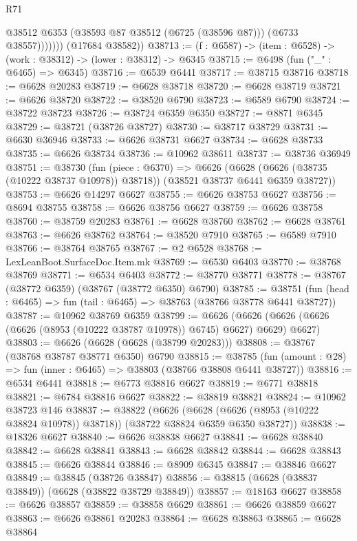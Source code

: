 \begin{lexlean}{R71}
\begin{coremodule}
                  @38512
                  @6353
                  (@38593 @87 @38512 (@6725 (@38596 @87)))
                  (@6733 @38557)))))))
      (@17684 @38582))
@38713 := (f : @6587) -> (item : @6528) -> (work : @38312) -> (lower : @38312) -> @6345
@38715 := @6498 (fun ("_" : @6465) => @6345)
@38716 := @6539 @6441
@38717 := @38715 @38716
@38718 := @6628 @20283
@38719 := @6628 @38718
@38720 := @6628 @38719
@38721 := @6626 @38720
@38722 := @38520 @6790
@38723 := @6589 @6790
@38724 := @38722 @38723
@38726 := @38724 @6359 @6350
@38727 := @8871 @6345
@38729 := @38721 (@38726 @38727)
@38730 := @38717 @38729
@38731 := @6630 @36946
@38733 := @6626 @38731 @6627
@38734 := @6628 @38733
@38735 := @6626 @38734
@38736 := @10962 @38611
@38737 := @38736 @36949
@38751 := @38730
    (fun (piece : @6370) =>
    @6626 (@6628 (@6626 (@38735 (@10222 @38737 @10978)) @38718)) (@38521 @38737 @6441 @6359 @38727))
@38753 := @6626 @14297 @6627
@38755 := @6626 @38753 @6627
@38756 := @8694 @38755
@38758 := @6626 @38756 @6627
@38759 := @6626 @38758
@38760 := @38759 @20283
@38761 := @6628 @38760
@38762 := @6628 @38761
@38763 := @6626 @38762
@38764 := @38520 @7910
@38765 := @6589 @7910
@38766 := @38764 @38765
@38767 := @2 @6528
@38768 := LexLeanBoot.SurfaceDoc.Item.mk
@38769 := @6530 @6403
@38770 := @38768 @38769
@38771 := @6534 @6403
@38772 := @38770 @38771
@38778 := @38767 (@38772 @6359) (@38767 (@38772 @6350) @6790)
@38785 := @38751 (fun (head : @6465) => fun (tail : @6465) => @38763 (@38766 @38778 @6441 @38727))
@38787 := @10962 @38769 @6359
@38799 := @6626
    (@6626 (@6626 (@6626 (@6626 (@8953 (@10222 @38787 @10978)) @6745) @6627) @6629) @6627)
@38803 := @6626 (@6628 (@6628 (@38799 @20283)))
@38808 := @38767 (@38768 @38787 @38771 @6350) @6790
@38815 := @38785 (fun (amount : @28) => fun (inner : @6465) => @38803 (@38766 @38808 @6441 @38727))
@38816 := @6534 @6441
@38818 := @6773 @38816 @6627
@38819 := @6771 @38818
@38821 := @6784 @38816 @6627
@38822 := @38819 @38821
@38824 := @10962 @38723 @146
@38837 := @38822
    (@6626 (@6628 (@6626 (@8953 (@10222 @38824 @10978)) @38718)) (@38722 @38824 @6359 @6350 @38727))
@38838 := @18326 @6627
@38840 := @6626 @38838 @6627
@38841 := @6628 @38840
@38842 := @6628 @38841
@38843 := @6628 @38842
@38844 := @6628 @38843
@38845 := @6626 @38844
@38846 := @8909 @6345
@38847 := @38846 @6627
@38849 := @38845 (@38726 @38847)
@38856 := @38815 (@6628 (@38837 @38849)) (@6628 (@38822 @38729 @38849))
@38857 := @18163 @6627
@38858 := @6626 @38857
@38859 := @38858 @6629
@38861 := @6626 @38859 @6627
@38863 := @6626 @38861 @20283
@38864 := @6628 @38863
@38865 := @6628 @38864

\end{coremodule}
\end{lexlean}
